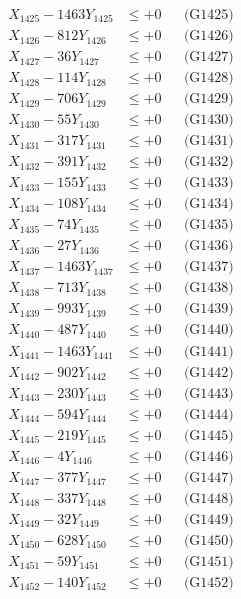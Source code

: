 \documentclass[a4paper,10pt]{article}
\begin{document}
{\begin{align}
X_{1425} - 1463Y_{1425} &\leq +0 && \text{(G1425)} \\
X_{1426} - 812Y_{1426} &\leq +0 && \text{(G1426)} \\
X_{1427} - 36Y_{1427} &\leq +0 && \text{(G1427)} \\
X_{1428} - 114Y_{1428} &\leq +0 && \text{(G1428)} \\
X_{1429} - 706Y_{1429} &\leq +0 && \text{(G1429)} \\
X_{1430} - 55Y_{1430} &\leq +0 && \text{(G1430)} \\
\allowbreak
X_{1431} - 317Y_{1431} &\leq +0 && \text{(G1431)} \\
X_{1432} - 391Y_{1432} &\leq +0 && \text{(G1432)} \\
X_{1433} - 155Y_{1433} &\leq +0 && \text{(G1433)} \\
X_{1434} - 108Y_{1434} &\leq +0 && \text{(G1434)} \\
X_{1435} - 74Y_{1435} &\leq +0 && \text{(G1435)} \\
X_{1436} - 27Y_{1436} &\leq +0 && \text{(G1436)} \\
X_{1437} - 1463Y_{1437} &\leq +0 && \text{(G1437)} \\
X_{1438} - 713Y_{1438} &\leq +0 && \text{(G1438)} \\
X_{1439} - 993Y_{1439} &\leq +0 && \text{(G1439)} \\
X_{1440} - 487Y_{1440} &\leq +0 && \text{(G1440)} \\
\allowbreak
X_{1441} - 1463Y_{1441} &\leq +0 && \text{(G1441)} \\
X_{1442} - 902Y_{1442} &\leq +0 && \text{(G1442)} \\
X_{1443} - 230Y_{1443} &\leq +0 && \text{(G1443)} \\
X_{1444} - 594Y_{1444} &\leq +0 && \text{(G1444)} \\
X_{1445} - 219Y_{1445} &\leq +0 && \text{(G1445)} \\
X_{1446} - 4Y_{1446} &\leq +0 && \text{(G1446)} \\
X_{1447} - 377Y_{1447} &\leq +0 && \text{(G1447)} \\
X_{1448} - 337Y_{1448} &\leq +0 && \text{(G1448)} \\
X_{1449} - 32Y_{1449} &\leq +0 && \text{(G1449)} \\
X_{1450} - 628Y_{1450} &\leq +0 && \text{(G1450)} \\
\allowbreak
X_{1451} - 59Y_{1451} &\leq +0 && \text{(G1451)} \\
X_{1452} - 140Y_{1452} &\leq +0 && \text{(G1452)} \\

\end{align}}
\end{document}
